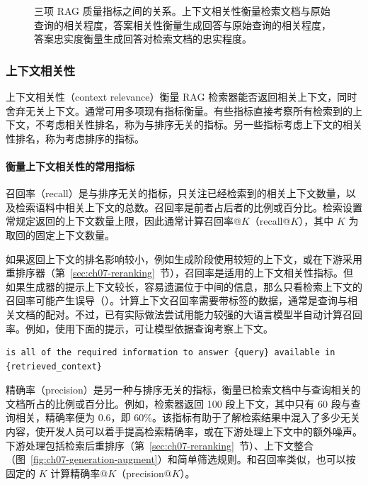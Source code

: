 \begin{figure}[!htbp]
\centering

\caption{三项 RAG 质量指标之间的关系。上下文相关性衡量检索文档与原始查询的相关程度，答案相关性衡量生成回答与原始查询的相关程度，答案忠实度衡量生成回答对检索文档的忠实程度。}
\label{fig:ch07-quality}
\end{figure}

\subsubsection{上下文相关性}
\label{sec:ch07-context-relevance}
上下文相关性（context relevance）衡量 RAG 检索器能否返回相关上下文，同时舍弃无关上下文。通常可用多项现有指标衡量。有些指标直接考察所有检索到的上下文，不考虑相关性排名，称为与排序无关的指标。另一些指标考虑上下文的相关性排名，称为考虑排序的指标。

\paragraph*{衡量上下文相关性的常用指标}
召回率（recall）是与排序无关的指标，只关注已经检索到的相关上下文数量，以及检索语料中相关上下文的总数。召回率是前者占后者的比例或百分比。检索设置常规定返回的上下文数量上限，因此通常计算召回率@$K$（recall@$K$），其中 $K$ 为取回的固定上下文数量。

\begin{practicaltip}
如果返回上下文的排名影响较小，例如生成阶段使用较短的上下文，或在下游采用重排序器（第~\ref{sec:ch07-reranking}~节），召回率是适用的上下文相关性指标。但如果生成器的提示上下文较长，容易遗漏位于中间的信息，那么只看检索上下文的召回率可能产生误导（）。计算上下文召回率需要带标签的数据，通常是查询与相关文档的配对。不过，已有实际做法尝试用能力较强的大语言模型半自动计算召回率。例如，使用下面的提示，可让模型依据查询考察上下文。
\begin{lstlisting}[nolol=true]
is all of the required information to answer {query} available in {retrieved_context}
\end{lstlisting}
\end{practicaltip}

精确率（precision）是另一种与排序无关的指标，衡量已检索文档中与查询相关的文档所占的比例或百分比。例如，检索器返回 100 段上下文，其中只有 60 段与查询相关，精确率便为 0.6，即 60\%。该指标有助于了解检索结果中混入了多少无关内容，使开发人员可以着手提高检索精确率，或在下游处理上下文中的额外噪声。下游处理包括检索后重排序（第~\ref{sec:ch07-reranking}~节）、上下文整合（图~\ref{fig:ch07-generation-augment}）和简单筛选规则。和召回率类似，也可以按固定的 $K$ 计算精确率@$K$（precision@$K$）。

